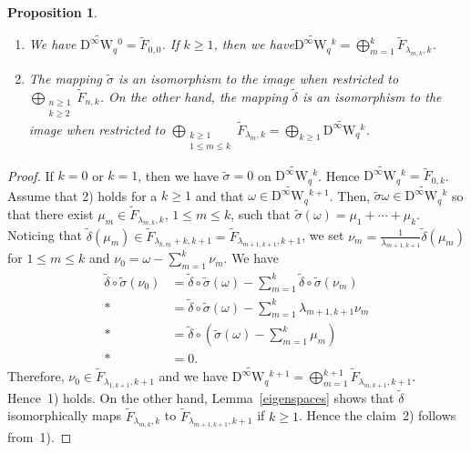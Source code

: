 \documentclass[12pt]{amsart}
\newcommand{\W}{\mathrm{W}}
\newcommand{\D}{\mathrm{D}}
\newtheorem{proposition}[theorem]{Proposition}
\theoremstyle{definition}
\theoremstyle{remark}
\begin{document}
\begin{proposition}
\label{prop9.5}
\begin{enumerate}
\item[\textup{1)}]
We have $\widetilde{\D^\infty\W_q}{}^0=\widetilde{F}_{0,0}$.
If $k\geq1$, then we have\linebreak \mbox{$\widetilde{\D^\infty\W_q}{}^k=\bigoplus_{m=1}^k\widetilde{F}_{\lambda_{m,k},k}$}.
\item[\textup{2)}]
The mapping $\widetilde\sigma$ is an isomorphism to the image when restricted to $\bigoplus_{\substack{n\geq1\\ k\geq2}}\widetilde{F}_{n,k}$.
On the other hand, the mapping $\widetilde\delta$ is an isomorphism to the image when restricted to $\bigoplus_{\substack{k\geq1\\1\leq m\leq k}}\widetilde{F}_{\lambda_m,k}=\bigoplus_{k\geq1}\widetilde{\D^\infty\W_q}{}^k$.
\end{enumerate}
\end{proposition}
\begin{proof}
If $k=0$ or $k=1$, then we have $\widetilde\sigma=0$ on $\widetilde{\D^\infty\W_q}{}^k$.
Hence $\widetilde{\D^\infty\W_q}{}^k=\widetilde{F}_{0,k}$.
Assume that 2) holds for a $k\geq1$ and that $\omega\in\widetilde{\D^\infty\W_q}{}^{k+1}$.
Then, $\widetilde\sigma\omega\in\widetilde{\D^\infty\W_q}{}^k$ so that there exist $\mu_m\in\widetilde{F}_{\lambda_{m,k},k}$, $1\leq m\leq k$, such that $\widetilde\sigma(\omega)=\mu_1+\cdots+\mu_k$.
Noticing that $\widetilde\delta(\mu_m)\in\widetilde{F}_{\lambda_{k,m}+k,k+1}=\widetilde{F}_{\lambda_{m+1,k+1},k+1}$, we set $\nu_m=\frac1{\lambda_{m+1,k+1}}\widetilde\delta(\mu_m)$ for $1\leq m\leq k$ and $\nu_0=\omega-\sum_{m=1}^k\nu_m$.
We have
\begin{align*}
\widetilde\delta\circ\widetilde\sigma(\nu_0)&=\widetilde\delta\circ\widetilde\sigma(\omega)-\sum_{m=1}^k\widetilde\delta\circ\widetilde\sigma(\nu_m)\\*
&=\widetilde\delta\circ\widetilde\sigma(\omega)-\sum_{m=1}^k\lambda_{m+1,k+1}\nu_m\\*
&=\widetilde\delta\circ\left(\widetilde\sigma(\omega)-\sum_{m=1}^k\mu_m\right)\\*
&=0.
\end{align*}
Therefore, $\nu_0\in\widetilde{F}_{\lambda_{1,k+1},k+1}$ and we have $\widetilde{\D^\infty\W_q}{}^{k+1}=\bigoplus_{m=1}^{k+1}\widetilde{F}_{\lambda_{m,k+1},k+1}$.
Hence~1) holds.
On the other hand, Lemma~\ref{eigenspaces} shows that $\widetilde\delta$ isomorphically maps $\widetilde{F}_{\lambda_{m,k},k}$ to $\widetilde{F}_{\lambda_{m+1,k+1},k+1}$ if $k\geq1$.
Hence the claim~2) follows from~1).
\end{proof}
\end{document}
